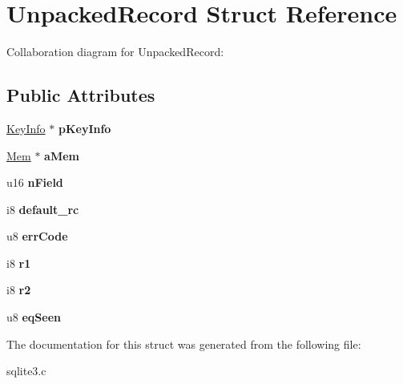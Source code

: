 \hypertarget{structUnpackedRecord}{}\section{Unpacked\+Record Struct Reference}
\label{structUnpackedRecord}


Collaboration diagram for Unpacked\+Record\+:
\subsection*{Public Attributes}
\begin{DoxyCompactItemize}
\item 
\hyperlink{structKeyInfo}{Key\+Info} $\ast$ {\bfseries p\+Key\+Info}\hypertarget{structUnpackedRecord_aeb43e7a1e300857cab2cbe98eacd575b}{}\label{structUnpackedRecord_aeb43e7a1e300857cab2cbe98eacd575b}

\item 
\hyperlink{structMem}{Mem} $\ast$ {\bfseries a\+Mem}\hypertarget{structUnpackedRecord_a3299c322ceb8b758dacc59701021ae9f}{}\label{structUnpackedRecord_a3299c322ceb8b758dacc59701021ae9f}

\item 
u16 {\bfseries n\+Field}\hypertarget{structUnpackedRecord_a2c5062735cdbc5039679d255cc900668}{}\label{structUnpackedRecord_a2c5062735cdbc5039679d255cc900668}

\item 
i8 {\bfseries default\+\_\+rc}\hypertarget{structUnpackedRecord_a8f18c6e59de409bf543de0965652faa9}{}\label{structUnpackedRecord_a8f18c6e59de409bf543de0965652faa9}

\item 
u8 {\bfseries err\+Code}\hypertarget{structUnpackedRecord_a5c42d9878256f14c87f0e099b31da4bb}{}\label{structUnpackedRecord_a5c42d9878256f14c87f0e099b31da4bb}

\item 
i8 {\bfseries r1}\hypertarget{structUnpackedRecord_aff1dc6903bbc46b232d912bd25683b8a}{}\label{structUnpackedRecord_aff1dc6903bbc46b232d912bd25683b8a}

\item 
i8 {\bfseries r2}\hypertarget{structUnpackedRecord_a57a0cc8800e409d46c7c804bc68b5b2b}{}\label{structUnpackedRecord_a57a0cc8800e409d46c7c804bc68b5b2b}

\item 
u8 {\bfseries eq\+Seen}\hypertarget{structUnpackedRecord_a2efeb544b71d5e6c98b39ac845380e4e}{}\label{structUnpackedRecord_a2efeb544b71d5e6c98b39ac845380e4e}

\end{DoxyCompactItemize}


The documentation for this struct was generated from the following file\+:\begin{DoxyCompactItemize}
\item 
sqlite3.\+c\end{DoxyCompactItemize}

